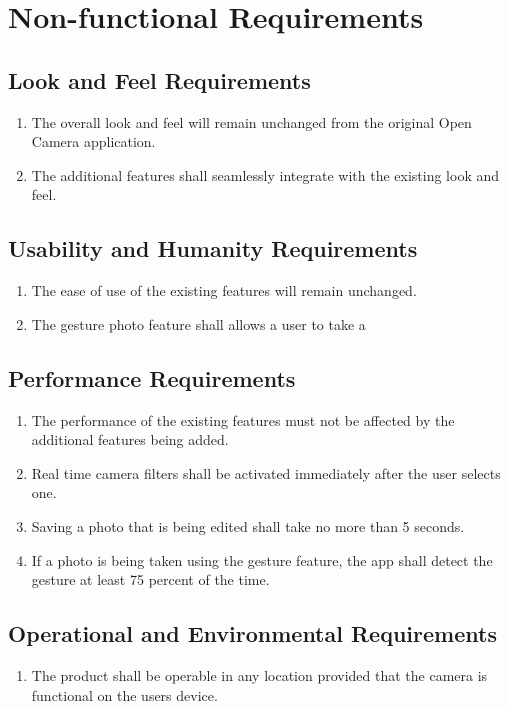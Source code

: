 \documentclass[12pt, titlepage]{article}
\begin{document}
\section{Non-functional Requirements}

\subsection{Look and Feel Requirements}
\begin{enumerate}[{LF}1. ]
	\item The overall look and feel will remain unchanged from the original Open Camera application.
	\item The additional features shall seamlessly integrate with the existing look and feel.
\end{enumerate}

\subsection{Usability and Humanity Requirements}
\begin{enumerate}[{UH}1. ]
	\item The ease of use of the existing features will remain unchanged.
	\item The gesture photo feature shall allows a user to take a
\end{enumerate}

\subsection{Performance Requirements}
\begin{enumerate}[{PR}1. ]
	\item The performance of the existing features must not be affected by the additional features being added.
	\item Real time camera filters shall be activated immediately after the user selects one.
	\item Saving a photo that is being edited shall take no more than 5 seconds.
	\item If a photo is being taken using the gesture feature, the app shall detect the gesture at least 75 percent of the time.
\end{enumerate}

\subsection{Operational and Environmental Requirements}
\begin{enumerate}[{OE}1. ]
	\item The product shall be operable in any location provided that the camera is functional on the users device.
\end{enumerate}
\end{document}
